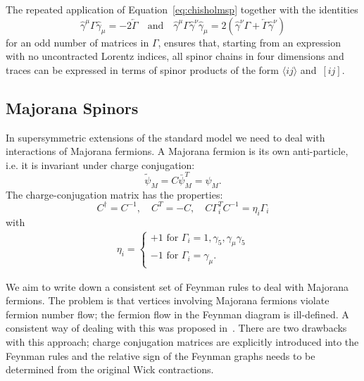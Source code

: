 \documentclass[preprint,number,12pt,sort&compress]{elsarticle}
\newcommand{\Spaa}[1]{\langle #1 \rangle}
\newcommand{\Spbb}[1]{[ #1 ]}
\begin{document}
The repeated application of Equation~\eqref{eq:chisholmsp}
together with the identities
\begin{equation}
\hat{\gamma}^\mu\Gamma\hat{\gamma}_\mu=-2\overleftarrow{\Gamma}%
\quad\text{and}\quad%
\hat{\gamma}^\mu\Gamma\hat{\gamma}^\nu\hat{\gamma}_\mu=2\left(%
\hat{\gamma}^\nu\Gamma+\overleftarrow{\Gamma}\hat{\gamma}^\nu\right)
\end{equation}
for an odd number of matrices in $\Gamma$,
ensures that, starting from an expression
with no uncontracted Lorentz indices, all spinor chains in four dimensions
and traces can be expressed in terms of spinor products of the form
$\Spaa{ij}$ and~$\Spbb{ij}$.

\subsection{Majorana Spinors}\label{ssec:majo-th}
In supersymmetric extensions of the standard model
we need to deal with interactions of Majorana fermions.
A Majorana fermion is its own anti-particle,
i.e. it is invariant under charge conjugation:
\begin{equation}
 \widetilde{\psi}_{M} = C \bar{\psi}_{M}^{T} = \psi_{M}.
\end{equation}
The charge-conjugation matrix has the properties:
\begin{equation}\label{eq:Cproperties}
 C^{\dagger} = C^{-1}, \quad C^{T} = - C, \quad C \Gamma^{T}_{i} C^{-1} = \eta_{i} \Gamma_{i} 
\end{equation}
with
\begin{align}\label{eq:etaproperties}
\eta_{i} = 
\left\{ 
\begin{array}{l}
 +1 \mbox{ for } \Gamma_{i} = 1, \gamma_{5}, \gamma_{\mu}\gamma_{5} \\
 -1 \mbox{ for } \Gamma_{i} = \gamma_{\mu}.
\end{array} 
\right.
\end{align}

We aim to write down a consistent set of Feynman rules to deal with Majorana
fermions. The problem is that vertices involving Majorana fermions
violate fermion number flow; the fermion flow in the Feynman diagram is
ill-defined.
A consistent way of dealing with this was proposed
in~\cite{Haber:1984rc}.
There are two drawbacks with this approach; charge conjugation matrices are
explicitly introduced into the Feynman rules and the relative sign
of the Feynman graphs needs to be determined from the original Wick contractions.
\end{document}
